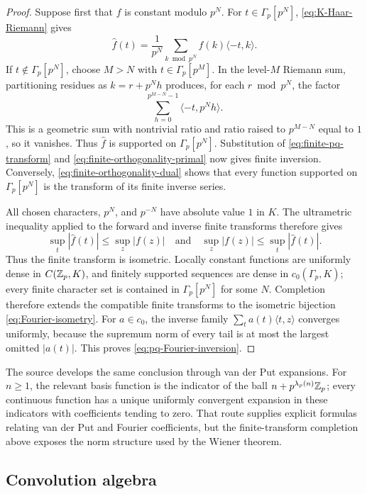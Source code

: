 \begin{proof}
Suppose first that $f$ is constant modulo $p^N$.  For
$t\in\Gamma_p[p^N]$, \cref{eq:K-Haar-Riemann} gives
\begin{equation}
\label{eq:finite-pq-transform}
 \widehat f(t)=\frac1{p^N}\sum_{k\bmod p^N}
 f(k)\langle-t,k\rangle.
\end{equation}
If $t\notin\Gamma_p[p^N]$, choose $M>N$ with
$t\in\Gamma_p[p^M]$.  In the level-$M$ Riemann sum, partitioning residues as
$k=r+p^Nh$ produces, for each $r\bmod p^N$, the factor
\[
 \sum_{h=0}^{p^{M-N}-1}\langle-t,p^Nh\rangle.
\]
This is a geometric sum with nontrivial ratio and ratio raised to
$p^{M-N}$ equal to $1$, so it vanishes.  Thus $\widehat f$ is supported on
$\Gamma_p[p^N]$.  Substitution of \cref{eq:finite-pq-transform} and
\cref{eq:finite-orthogonality-primal} now gives finite inversion.  Conversely,
\cref{eq:finite-orthogonality-dual} shows that every function supported on
$\Gamma_p[p^N]$ is the transform of its finite inverse series.

All chosen characters, $p^N$, and $p^{-N}$ have absolute value $1$ in $K$.
The ultrametric inequality applied to the forward and inverse finite
transforms therefore gives
\[
 \sup_t|\widehat f(t)|\leq\sup_z|f(z)|
 \quad\text{and}\quad
 \sup_z|f(z)|\leq\sup_t|\widehat f(t)|.
\]
Thus the finite transform is isometric.  Locally constant functions are
uniformly dense in $C(\mathbb Z_p,K)$, and finitely supported sequences are dense
in $c_0(\Gamma_p,K)$; every finite character set is contained in
$\Gamma_p[p^N]$ for some $N$.  Completion therefore extends the compatible
finite transforms to the isometric bijection \cref{eq:Fourier-isometry}.
For $a\in c_0$, the inverse family
$\sum_ta(t)\langle t,z\rangle$ converges uniformly, because the supremum norm
of every tail is at most the largest omitted $|a(t)|$.  This proves
\cref{eq:pq-Fourier-inversion}.
\end{proof}

The source develops the same conclusion through van der Put expansions.
For $n\geq1$, the relevant basis function is the indicator of the ball
$n+p^{\lambda_p(n)}\mathbb Z_p$; every continuous function has a unique uniformly
convergent expansion in these indicators with coefficients tending to zero.
That route supplies explicit formulas relating van der Put and Fourier
coefficients, but the finite-transform completion above exposes the norm
structure used by the Wiener theorem.

\subsection{Convolution algebra}

